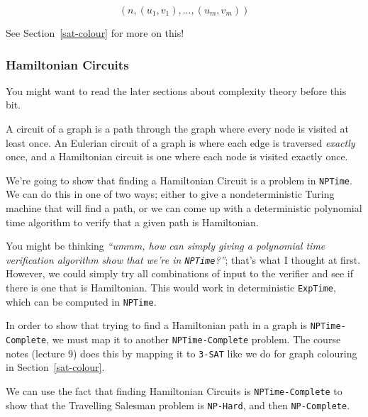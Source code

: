 \[
  (n, (u_1, v_1), \dots, (u_m, v_m))
\]

See Section~\ref{sat-colour} for more on this!

\subsubsection{Hamiltonian Circuits}

{\tiny \vspace{-2em} You might want to read the later sections about complexity 
theory before this bit.}

A circuit of a graph is a path through the graph where every node is visited at
least once. An Eulerian circuit of a graph is where each edge is traversed
\textit{exactly} once, and a Hamiltonian circuit is one where each node is
visited exactly once.


We're going to show that finding a Hamiltonian Circuit is a problem in
\texttt{NPTime}. We can do this in one of two ways; either to give a
nondeterministic Turing machine that will find a path, or we can come up with a
deterministic polynomial time algorithm to verify that a given path is
Hamiltonian.

You might be thinking \textit{``ummm, how can simply giving a polynomial time
verification algorithm show that we're in \texttt{NPTime}?''}; that's what I
thought at first. However, we could simply try all combinations of input to the
verifier and see if there is one that is Hamiltonian. This would work in
deterministic \texttt{ExpTime}, which can be computed in \texttt{NPTime}.

In order to show that trying to find a Hamiltonian path in a graph is
\texttt{NPTime-Complete}, we must map it to another \texttt{NPTime-Complete} 
problem. The course notes (lecture 9) does this by mapping it to \texttt{3-SAT} 
like we do for graph colouring in Section~\ref{sat-colour}.

We can use the fact that finding Hamiltonian Circuits is
\texttt{NPTime-Complete} to show that the Travelling Salesman problem is
\texttt{NP-Hard}, and then \texttt{NP-Complete}.



